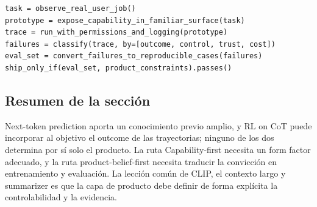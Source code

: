 \begin{lstlisting}[caption={Ciclo mínimo de validación de un prototipo Capability-first}]
task = observe_real_user_job()
prototype = expose_capability_in_familiar_surface(task)
trace = run_with_permissions_and_logging(prototype)
failures = classify(trace, by=[outcome, control, trust, cost])
eval_set = convert_failures_to_reproducible_cases(failures)
ship_only_if(eval_set, product_constraints).passes()
\end{lstlisting}


\subsection{Resumen de la sección}

Next-token prediction aporta un conocimiento previo amplio, y RL on CoT puede incorporar al objetivo el outcome de las trayectorias; ninguno de los dos determina por sí solo el producto. La ruta Capability-first necesita un form factor adecuado, y la ruta product-belief-first necesita traducir la convicción en entrenamiento y evaluación. La lección común de CLIP, el contexto largo y summarizer es que la capa de producto debe definir de forma explícita la controlabilidad y la evidencia.
